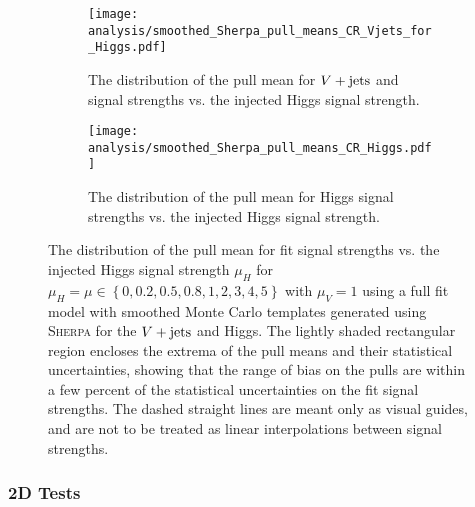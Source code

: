 \begin{figure}[htbp]
 \centering
 \begin{subfigure}[t]{0.48\textwidth}
  \centering
  \texttt{[image: analysis/smoothed\_Sherpa\_pull\_means\_CR\_Vjets\_for\_Higgs.pdf]}
  \caption[The distribution of the pull mean for $\Vjets$ and signal strengths vs. the injected Higgs signal strength.]{%
   The distribution of the pull mean for $\Vjets$ and signal strengths vs. the injected Higgs signal strength.}
  \label{fig:pulls_Vjets_smoothed_Sherpa}
 \end{subfigure}%
 \quad
 \begin{subfigure}[t]{0.48\textwidth}
  \centering
  \texttt{[image: analysis/smoothed\_Sherpa\_pull\_means\_CR\_Higgs.pdf]}
  \caption[The distribution of the pull mean for Higgs signal strengths vs. the injected Higgs signal strength.]{%
   The distribution of the pull mean for Higgs signal strengths vs. the injected Higgs signal strength.}
  \label{fig:pulls_Higgs_smoothed_Sherpa}
 \end{subfigure}
 \caption[The distribution of the pull mean for fit signal strengths vs. the injected Higgs signal strength.]{%
  The distribution of the pull mean for fit signal strengths vs. the injected Higgs signal strength $\mu_{H}$ for $\mu_{H} = \mu \in \left\{0, 0.2, 0.5, 0.8, 1, 2, 3, 4, 5\right\}$ with $\mu_{V} = 1$ using a full fit model with smoothed Monte Carlo templates generated using \textsc{Sherpa} for the $\Vjets$ and Higgs.
  The lightly shaded rectangular region encloses the extrema of the pull means and their statistical uncertainties, showing that the range of bias on the pulls are within a few percent of the statistical uncertainties on the fit signal strengths.
  The dashed straight lines are meant only as visual guides, and are not to be treated as linear interpolations between signal strengths.}
 \label{fig:pulls_summary_Higgs_smoothed_Sherpa}
\end{figure}

\subsubsection{2D Tests}

